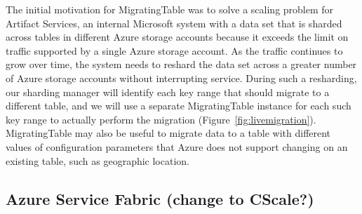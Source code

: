 The initial motivation for MigratingTable was to solve a scaling problem for Artifact Services, an internal Microsoft system with a data set that is sharded across tables in different Azure storage accounts because it exceeds the limit on traffic supported by a single Azure storage account.  As the traffic continues to grow over time, the system needs to reshard the data set across a greater number of Azure storage accounts without interrupting service.  During such a resharding, our sharding manager will identify each key range that should migrate to a different table, and we will use a separate MigratingTable instance for each such key range to actually perform the migration (Figure~\ref{fig:livemigration}).  MigratingTable may also be useful to migrate data to a table with different values of configuration parameters that Azure does not support changing on an existing table, such as geographic location.

\subsection{Azure Service Fabric (change to CScale?)}
\label{sec:cases:fabric}


